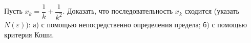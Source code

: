 Пусть $x_k = \dfrac{1}k + \dfrac{1}{k^2}$.
Доказать, что последовательность $x_k$ сходится
(указать $N(\varepsilon)$):
а) с помощью непосредственно определения предела;
б) с помощью критерия Коши.
